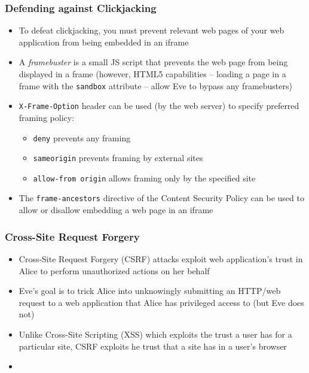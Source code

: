 \begin{frame}
    \frametitle{Defending against Clickjacking}
    \begin{itemize}
        \item To defeat clickjacking, you must prevent relevant web pages of your web application from being embedded in an iframe
        \item A \emph{framebuster} is a small JS script that prevents the web page from being displayed in a frame (however, HTML5 capabilities -- loading a page in a frame with the \texttt{sandbox} attribute -- allow Eve to bypass any framebusters)
        \item \texttt{X-Frame-Option} header can be used (by the web server) to specify preferred framing policy:
        \begin{itemize}
            \item \texttt{deny} prevents any framing
            \item \texttt{sameorigin} prevents framing by external sites
            \item \texttt{allow-from origin} allows framing only by the specified site
        \end{itemize}
        \item The \texttt{frame-ancestors} directive of the Content Security Policy can be used to allow or disallow embedding a web page in an iframe
    \end{itemize}
\end{frame}




\begin{frame}
    \frametitle{Cross-Site Request Forgery}
    \begin{itemize}
        \item Cross-Site Request Forgery (CSRF) attacks exploit web application's trust in Alice to perform unauthorized actions on her behalf
        \item Eve's goal is to trick Alice into unknowingly submitting an HTTP/web request to a web application that Alice has privileged access to (but Eve does not)
        \item Unlike Cross-Site Scripting (XSS) which exploits the trust a user has for a particular site, CSRF exploits he trust that a site has in a user's browser
        \item 
    \end{itemize}
\end{frame}

